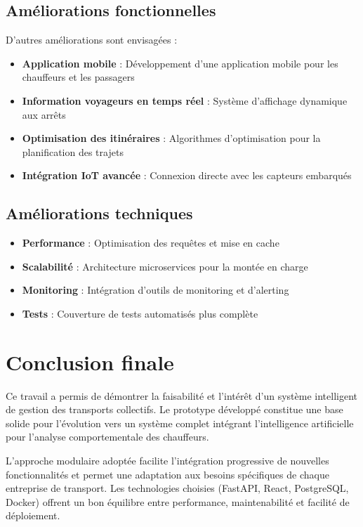 \documentclass[a4paper, 12pt]{book}
\begin{document}
\subsection{Améliorations fonctionnelles}

D'autres améliorations sont envisagées :

\begin{itemize}
    \item \textbf{Application mobile} : Développement d'une application mobile pour les chauffeurs et les passagers
    \item \textbf{Information voyageurs en temps réel} : Système d'affichage dynamique aux arrêts
    \item \textbf{Optimisation des itinéraires} : Algorithmes d'optimisation pour la planification des trajets
    \item \textbf{Intégration IoT avancée} : Connexion directe avec les capteurs embarqués
\end{itemize}

\subsection{Améliorations techniques}

\begin{itemize}
    \item \textbf{Performance} : Optimisation des requêtes et mise en cache
    \item \textbf{Scalabilité} : Architecture microservices pour la montée en charge
    \item \textbf{Monitoring} : Intégration d'outils de monitoring et d'alerting
    \item \textbf{Tests} : Couverture de tests automatisés plus complète
\end{itemize}

\section{Conclusion finale}

Ce travail a permis de démontrer la faisabilité et l'intérêt d'un système intelligent de gestion des transports collectifs. Le prototype développé constitue une base solide pour l'évolution vers un système complet intégrant l'intelligence artificielle pour l'analyse comportementale des chauffeurs.

L'approche modulaire adoptée facilite l'intégration progressive de nouvelles fonctionnalités et permet une adaptation aux besoins spécifiques de chaque entreprise de transport. Les technologies choisies (FastAPI, React, PostgreSQL, Docker) offrent un bon équilibre entre performance, maintenabilité et facilité de déploiement.
\end{document}

